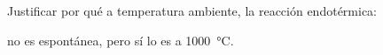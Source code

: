 Justificar por qué a temperatura ambiente, la reacción endotérmica:\\
\begin{center}
\end{center}
no es espontánea, pero sí lo es a \SI{1000}{\celsius}.
